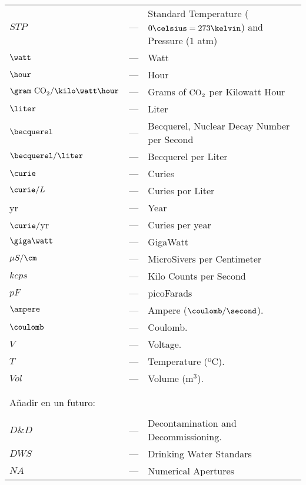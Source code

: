 \begin{longtable}{p{25mm} c p{120mm} }
$STP$ & --- & Standard Temperature ($0\celsius=273\kelvin$) and Pressure ($1$ atm)\\
$\watt$ & --- & Watt\\
$\hour$ & --- & Hour\\
$\gram~\ce{CO_2} /\kilo\watt\hour$ & --- & Grams of $\ce{CO_2}$ per Kilowatt Hour\\
$\liter$ & --- & Liter\\
$\becquerel$ & --- & Becquerel, Nuclear Decay Number per Second\\
$\becquerel/\liter$ & --- & Becquerel per Liter\\
$\curie$ & --- & Curies\\
$\curie/L$ & --- & Curies por Liter\\
yr & --- & Year\\
$\curie/$yr & --- & Curies per year\\
$\giga\watt$ & --- & GigaWatt\\
$\mu S/\cm$ & --- & MicroSivers per Centimeter\\
$kcps$ & --- & Kilo Counts per Second\\
$pF$ & --- & picoFarads\\
$\ampere$ & --- & Ampere ($\coulomb/\second$).\\
$\coulomb$ & --- & Coulomb.\\
$V$ & --- & Voltage.\\
$T$ & --- & Temperature (ºC).\\
$Vol$ & --- & Volume (m$^3$).\\


\\
\\
\multicolumn{3}{l}{Añadir en un futuro:}\\
\\
$D\&D$ & --- & Decontamination and Decommissioning.\\
$DWS$ & --- & Drinking Water Standars\\
$NA$ & --- & Numerical Apertures\\

\end{longtable}
